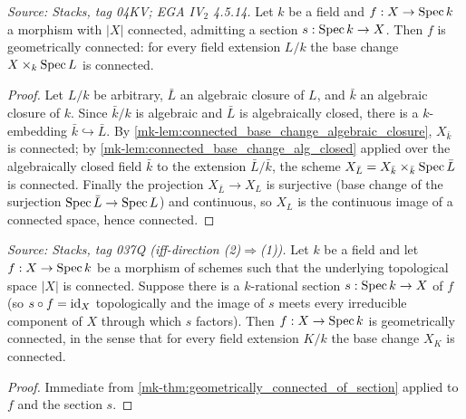 \begin{theorem}\label{mk-thm:geometrically_connected_of_section}
  \leanok

  \textit{Source: Stacks, tag 04KV; EGA IV\(_2\) 4.5.14.}
  Let \(k\) be a field and \(f : X \to \operatorname{Spec} k\) a morphism with
  \(|X|\) connected, admitting a section \(s : \operatorname{Spec} k \to X\). Then
  \(f\) is geometrically connected: for every field extension \(L/k\)
  the base change \(X \times_k \operatorname{Spec} L\) is connected.
\end{theorem}
\begin{proof}
  \leanok
  Let \(L/k\) be arbitrary, \(\bar L\) an algebraic closure of \(L\),
  and \(\bar k\) an algebraic closure of \(k\). Since \(\bar k/k\) is
  algebraic and \(\bar L\) is algebraically closed, there is a
  \(k\)-embedding \(\bar k \hookrightarrow \bar L\). By
  \ref{mk-lem:connected_base_change_algebraic_closure},
  \(X_{\bar k}\) is connected; by
  \ref{mk-lem:connected_base_change_alg_closed} applied over the
  algebraically closed field \(\bar k\) to the extension
  \(\bar L / \bar k\), the scheme
  \(X_{\bar L} = X_{\bar k} \times_{\bar k} \operatorname{Spec} \bar L\) is
  connected. Finally the projection \(X_{\bar L} \to X_L\) is
  surjective (base change of the surjection
  \(\operatorname{Spec} \bar L \to \operatorname{Spec} L\)) and continuous, so \(X_L\) is the
  continuous image of a connected space, hence connected.
\end{proof}
\begin{lemma}\label{mk-lem:geometricallyConnected_of_connected_of_section}
  \leanok

  \textit{Source: Stacks, tag 037Q (iff-direction (2)\(\Rightarrow\)(1)).}
  Let \(k\) be a field and let \(f : X \to \operatorname{Spec} k\) be a morphism of
  schemes such that the underlying topological space \(|X|\) is
  connected. Suppose there is a \(k\)-rational section \(s : \operatorname{Spec} k \to X\)
  of \(f\) (so \(s \circ f = \operatorname{id}_X\) topologically and the image of \(s\)
  meets every irreducible component of \(X\) through which \(s\) factors).
  Then \(f : X \to \operatorname{Spec} k\) is geometrically connected, in the sense
  that for every field extension \(K/k\) the base change \(X_K\) is
  connected.
\end{lemma}
\begin{proof}
  \leanok
  Immediate from \ref{mk-thm:geometrically_connected_of_section} applied
  to \(f\) and the section \(s\).
\end{proof}

